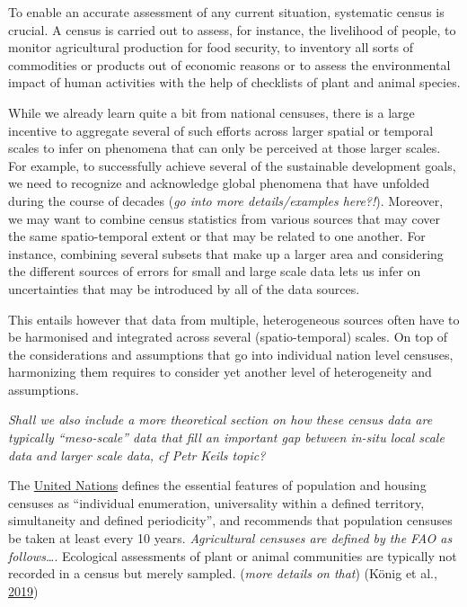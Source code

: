 \documentclass[12pt,]{article}
\begin{document}
To enable an accurate assessment of any current situation, systematic census is crucial. A census is carried out to assess, for instance, the livelihood of people, to monitor agricultural production for food security, to inventory all sorts of commodities or products out of economic reasons or to assess the environmental impact of human activities with the help of checklists of plant and animal species.

While we already learn quite a bit from national censuses, there is a large incentive to aggregate several of such efforts across larger spatial or temporal scales to infer on phenomena that can only be perceived at those larger scales.
For example, to successfully achieve several of the sustainable development goals, we need to recognize and acknowledge global phenomena that have unfolded during the course of decades (\emph{go into more details/examples here?!}).
Moreover, we may want to combine census statistics from various sources that may cover the same spatio-temporal extent or that may be related to one another.
For instance, combining several subsets that make up a larger area and considering the different sources of errors for small and large scale data lets us infer on uncertainties that may be introduced by all of the data sources.

This entails however that data from multiple, heterogeneous sources often have to be harmonised and integrated across several (spatio-temporal) scales. On top of the considerations and assumptions that go into individual nation level censuses, harmonizing them requires to consider yet another level of heterogeneity and assumptions.

\emph{Shall we also include a more theoretical section on how these census data are typically ``meso-scale'' data that fill an important gap between in-situ local scale data and larger scale data, cf Petr Keils topic?}

The \href{https://unstats.un.org/unsd/demographic/sources/census/docs/P\&R_Rev2.pdf}{United Nations} defines the essential features of population and housing censuses as ``individual enumeration, universality within a defined territory, simultaneity and defined periodicity'', and recommends that population censuses be taken at least every 10 years. \emph{Agricultural censuses are defined by the FAO as follows\ldots{}}.
Ecological assessments of plant or animal communities are typically not recorded in a census but merely sampled. (\emph{more details on that}) (König et al., \protect\hyperlink{ref-Koenig2019}{2019})
\end{document}
